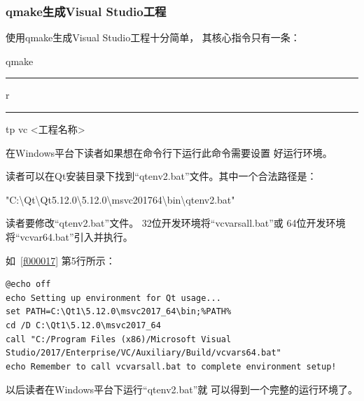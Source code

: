 
\subsubsection{
qmake生成Visual Studio工程
}\label{ss000910}

使用qmake生成Visual Studio工程十分简单，
其核心指令只有一条：

    \begin{center}
        \sourcefontone{}qmake \hspace{0.05em}\rule[0.7ex]{0.4em}{0.6pt}\hspace{0.05em}r \hspace{0.05em}\rule[0.7ex]{0.4em}{0.6pt}\hspace{0.05em}tp vc <工程名称> 
    \end{center}

在Windows平台下读者如果想在命令行下运行此命令需要设置
好运行环境。


读者可以在Qt安装目录下找到“qtenv2.bat”文件。其中一个合法路径是：
\begin{littlelongworld}
"C:\textbackslash{}Qt\textbackslash{}Qt5.12.0\textbackslash{}5.12.0\textbackslash{}msvc2017\underline{\hspace{0.5em}}64\textbackslash{}bin\textbackslash{}qtenv2.bat"
\end{littlelongworld}

读者要修改“qtenv2.bat”文件。
32位开发环境将“vcvarsall.bat”或
64位开发环境将“vcvar64.bat”引入并执行。

如\lstlistingname\ \ref{f000017}
第5行所示：
\begin{lstlisting}[label=f000017,
caption=GoodLuck,
title=\lstlistingname\ \thelstlisting
]
@echo off
echo Setting up environment for Qt usage...
set PATH=C:\Qt1\5.12.0\msvc2017_64\bin;%PATH%
cd /D C:\Qt1\5.12.0\msvc2017_64
call "C:/Program Files (x86)/Microsoft Visual Studio/2017/Enterprise/VC/Auxiliary/Build/vcvars64.bat"
echo Remember to call vcvarsall.bat to complete environment setup!
\end{lstlisting}          %
以后读者在Windows平台下运行“qtenv2.bat”就
可以得到一个完整的运行环境了。








